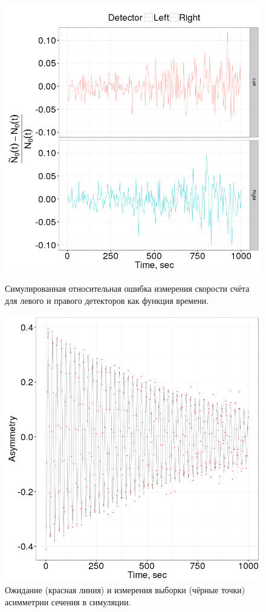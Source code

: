 \documentclass{jpconf}
\begin{document}
\begin{figure}[h]
	\begin{minipage}{.45\textwidth}
		\centering
		\includegraphics[scale=.4]{img/Final/LR_detector_relErr}
		\caption{Симулированная относительная ошибка измерения скорости счёта для левого и правого детекторов как функция времени.\label{fig:LRDetErr}}
	\end{minipage}\hspace{.5in}
	\begin{minipage}{.45\textwidth}
		\centering
		\includegraphics[scale=.4]{img/Final/Asymmetry}
		\caption{Ожидание (красная линия) и измерения выборки (чёрные точки) асимметрии сечения в симуляции.\label{fig:Asym}}
	\end{minipage}
	

\end{figure}
\end{document}
